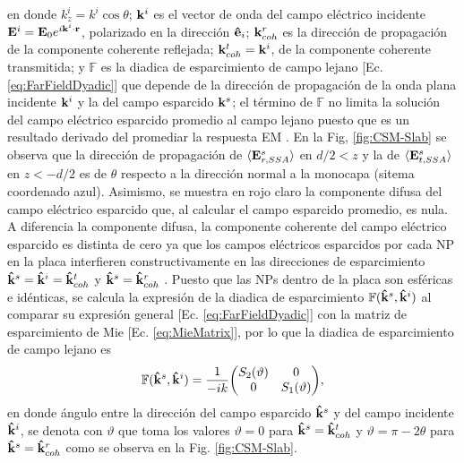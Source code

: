 en donde $k^i_z = k^i\cos\theta$; $\vb{k}^i$ es el vector de onda del campo eléctrico incidente $\vb{E}^i = \vb{E}_0 e^{i\vb{k}^i\cdot\vb{r}}$, polarizado en la dirección $\vu{e}_i$; $\vb{k}^r_{coh}$ es la dirección de propagación de la componente coherente reflejada; $\vb{k}^t_{coh}=\vb{k}^i$, de la componente coherente transmitida; y $\mathbb{F}$ es la diadica de esparcimiento de campo lejano [Ec. \eqref{eq:FarFieldDyadic}] que depende de la dirección de propagación de la onda plana incidente $\vb{k}^i$ y la del campo esparcido $\vb{k}^s$; el término de $\mathbb{F}$ no limita la solución del campo eléctrico esparcido promedio al campo lejano puesto que es un resultado derivado del promediar la respuesta EM \cite{gutierrez2012overview}. En la Fig, \ref{fig:CSM-Slab} se observa que la dirección de propagación de  $\langle \vb{E}^s_{r,SSA}\rangle$ en $d/2<z$ y la de $\langle \vb{E}^s_{t,SSA}\rangle$ en  $z<-d/2$ es de $\theta$ respecto a la dirección normal a la monocapa (sitema coordenado azul). Asimismo, se muestra en rojo claro la componente difusa del campo eléctrico esparcido que, al calcular el campo esparcido promedio, es nula. A diferencia la componente difusa, la componente coherente del campo eléctrico esparcido es distinta de cero ya que los campos eléctricos esparcidos por cada NP en la placa interfieren constructivamente en las direcciones de esparcimiento $\vu{k}^s =\vu{k}^i=\vu{k}^t_{coh}$ y $\vu{k}^s =\vu{k}^r_{coh}$ \cite{garcia2012multiple}. Puesto que las NPs dentro de la placa son esféricas e idénticas, se calcula la expresión de la diadica de esparcimiento $\mathbb{F}(\vu{k}^s,\vu{k}^i)$ al comparar su expresión general [Ec. \eqref{eq:FarFieldDyadic}] con la matriz de esparcimiento de Mie [Ec. \eqref{eq:MieMatrix}], por lo que la diadica de esparcimiento de campo lejano es
	\begin{align}
	\mathbb{F}(\vu{k}^s,\vu{k}^i) = \frac{1}{-ik} 
	 \mqty(S_2(\vartheta) & 0 \\ 0 & S_1(\vartheta)),
	 \label{eq:FFDydadic-Mie}
	\end{align}
en donde ángulo entre la dirección del campo esparcido $\vu{k}^s$ y del campo incidente $\vu{k}^i$, se denota con $\vartheta$ que toma los valores $\vartheta = 0$ para $\vu{k}^s = \vu{k}^t_{coh}$ y $\vartheta = \pi-2\theta$  para $\vu{k}^s = \vu{k}^r_{coh}$ como se observa en la Fig. \ref{fig:CSM-Slab}.
	

